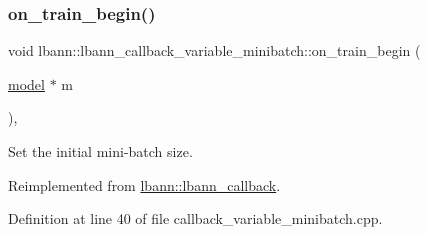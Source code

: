 \mbox{\label{classlbann_1_1lbann__callback__variable__minibatch_a4f5d8ab04ab3e1cc3aa66327d3712f51}} 
\subsubsection{\texorpdfstring{on\+\_\+train\+\_\+begin()}{on\_train\_begin()}}
{\footnotesize\ttfamily void lbann\+::lbann\+\_\+callback\+\_\+variable\+\_\+minibatch\+::on\+\_\+train\+\_\+begin (\begin{DoxyParamCaption}\item[{\hyperlink{classlbann_1_1model}{model} $\ast$}]{m }\end{DoxyParamCaption})\hspace{0.3cm}{\ttfamily [override]}, {\ttfamily [virtual]}}



Set the initial mini-\/batch size. 



Reimplemented from \hyperlink{classlbann_1_1lbann__callback_a7c8f0d211967ccc5219144e92571ab26}{lbann\+::lbann\+\_\+callback}.



Definition at line 40 of file callback\+\_\+variable\+\_\+minibatch.\+cpp.


